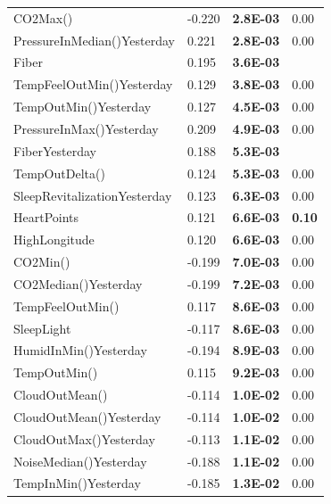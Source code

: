 \documentclass[conference]{IEEEtran}
\begin{document}
\begin{table}[]
\begin{tabular}{llll}
CO2Max()                       & -0.220 & \textbf{2.8E-03} & 0.00           \\
PressureInMedian()Yesterday    & 0.221  & \textbf{2.8E-03} & 0.00           \\
Fiber                          & 0.195  & \textbf{3.6E-03} &                \\
TempFeelOutMin()Yesterday      & 0.129  & \textbf{3.8E-03} & 0.00           \\
TempOutMin()Yesterday          & 0.127  & \textbf{4.5E-03} & 0.00           \\
PressureInMax()Yesterday       & 0.209  & \textbf{4.9E-03} & 0.00           \\
FiberYesterday                 & 0.188  & \textbf{5.3E-03} &                \\
TempOutDelta()                 & 0.124  & \textbf{5.3E-03} & 0.00           \\
SleepRevitalizationYesterday   & 0.123  & \textbf{6.3E-03} & 0.00           \\
HeartPoints                    & 0.121  & \textbf{6.6E-03} & \textbf{0.10}  \\
HighLongitude                  & 0.120  & \textbf{6.6E-03} & 0.00           \\
CO2Min()                       & -0.199 & \textbf{7.0E-03} & 0.00           \\
CO2Median()Yesterday           & -0.199 & \textbf{7.2E-03} & 0.00           \\
TempFeelOutMin()               & 0.117  & \textbf{8.6E-03} & 0.00           \\
SleepLight                     & -0.117 & \textbf{8.6E-03} & 0.00           \\
HumidInMin()Yesterday          & -0.194 & \textbf{8.9E-03} & 0.00           \\
TempOutMin()                   & 0.115  & \textbf{9.2E-03} & 0.00           \\
CloudOutMean()                 & -0.114 & \textbf{1.0E-02} & 0.00           \\
CloudOutMean()Yesterday        & -0.114 & \textbf{1.0E-02} & 0.00           \\
CloudOutMax()Yesterday         & -0.113 & \textbf{1.1E-02} & 0.00           \\
NoiseMedian()Yesterday         & -0.188 & \textbf{1.1E-02} & 0.00           \\
TempInMin()Yesterday           & -0.185 & \textbf{1.3E-02} & 0.00           \\

\end{tabular}
\end{table}
\end{document}
